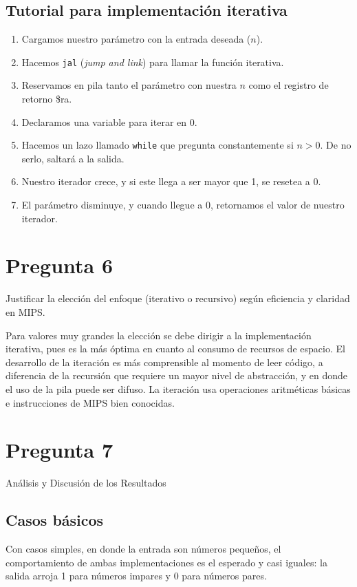 \documentclass[12pt]{article}
\begin{document}
\subsection*{Tutorial para implementación iterativa}
\begin{enumerate}
    \item Cargamos nuestro parámetro con la entrada deseada ($n$).
    \item Hacemos \texttt{jal} (\textit{jump and link}) para llamar la función iterativa.
    \item Reservamos en pila tanto el parámetro con nuestra $n$ como el registro de retorno \$ra.
    \item Declaramos una variable para iterar en 0.
    \item Hacemos un lazo llamado \texttt{while} que pregunta constantemente si $n > 0$. De no serlo, saltará a la salida.
    \item Nuestro iterador crece, y si este llega a ser mayor que 1, se resetea a 0.
    \item El parámetro disminuye, y cuando llegue a 0, retornamos el valor de nuestro iterador.
\end{enumerate}

\section*{Pregunta 6}
Justificar la elección del enfoque (iterativo o recursivo) según eficiencia y claridad en MIPS.

Para valores muy grandes la elección se debe dirigir a la implementación iterativa, pues es la más óptima en cuanto al consumo de recursos de espacio. El desarrollo de la iteración es más comprensible al momento de leer código, a diferencia de la recursión que requiere un mayor nivel de abstracción, y en donde el uso de la pila puede ser difuso. La iteración usa operaciones aritméticas básicas e instrucciones de MIPS bien conocidas.

\section*{Pregunta 7}
Análisis y Discusión de los Resultados

\subsection*{Casos básicos}
Con casos simples, en donde la entrada son números pequeños, el comportamiento de ambas implementaciones es el esperado y casi iguales: la salida arroja 1 para números impares y 0 para números pares.
\end{document}
